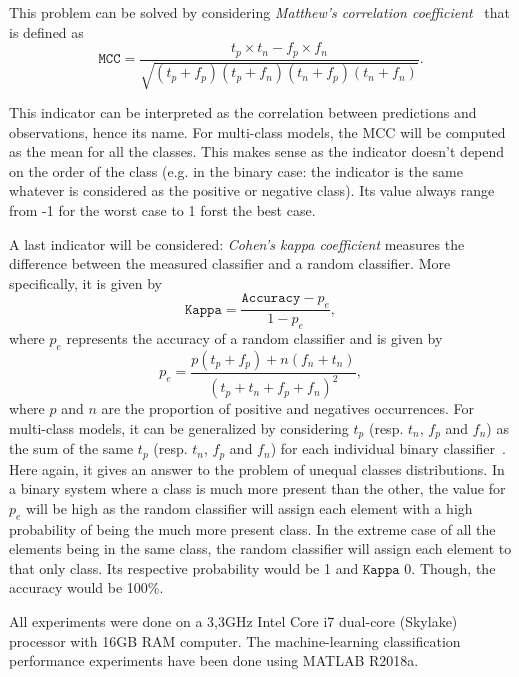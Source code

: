 This problem can be solved by considering \emph{Matthew's correlation coefficient}~\cite{Matthews1975ComparisonLysozyme} that is defined as
\begin{equation}
    \mathtt{MCC} = \frac{t_p \times t_n - f_p \times f_n}{\sqrt{(t_p + f_p)(t_p+f_n)(t_n+f_p)(t_n+f_n)}}.
\end{equation}

This indicator can be interpreted as the correlation between predictions and observations, hence its name. For multi-class models, the MCC will be computed as the mean for all the classes. This makes sense as the indicator doesn't depend on the order of the class (e.g. in the binary case: the indicator is the same whatever is considered as the positive or negative class). Its value always range from -1 for the worst case to 1 forst the best case.

A last indicator will be considered: \emph{Cohen's kappa coefficient} measures the difference between the measured classifier and a random classifier. More specifically, it is given by
\begin{equation}
    \mathtt{Kappa} = \frac{\mathtt{Accuracy}-p_e}{1-p_e},
\end{equation}
where $p_e$ represents the accuracy of a random classifier and is given by
\begin{equation}
    p_e = \frac{p(t_p+f_p) + n(f_n+t_n)}{(t_p+t_n+f_p+f_n)^2},
\end{equation}
where $p$ and $n$ are the proportion of positive and negatives occurrences. For multi-class models, it can be generalized by considering $t_p$ (resp. $t_n$, $f_p$ and $f_n$) as the sum of the same $t_p$ (resp. $t_n$, $f_p$ and $f_n$) for each individual binary classifier~\cite{doi:10.1177/001316446002000104}. Here again, it gives an answer to the problem of unequal classes distributions. In a binary system where a class is much more present than the other, the value for $p_e$ will be high as the random classifier will assign each element with a high probability of being the much more present class. In the extreme case of all the elements being in the same class, the random classifier will assign each element to that only class. Its respective probability would be 1 and $\mathtt{Kappa}$ 0. Though, the accuracy would be 100\%.

All experiments were done on a 3,3GHz Intel Core i7 dual-core (Skylake) processor with 16GB RAM computer. The machine-learning classification performance experiments have been done using MATLAB R2018a.